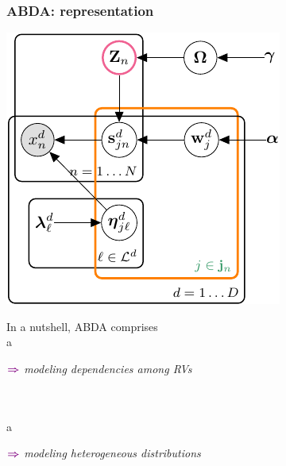 \documentclass[xcolor={usenames,dvipsnames,svgnames}, compress, aspectratio=169, 11pt]{beamer}
\newcommand{\comment}[3][\small]{\begin{minipage}{1\linewidth}
          \raggedleft
          {
            $\color{violet}\boldsymbol\Rightarrow$
            #1
            {\emph{#2}}
          }
      \end{minipage}#3\\
}
\begin{document}
\begin{frame}[t, htt=bgrey2]
  \frametitle{ABDA: representation}

  \large
  \begin{minipage}[t]{0.3\linewidth}
    \vspace{15pt}
    \includegraphics[width=.99\linewidth]{figures/joint-param-hspn-crop}
  \end{minipage}\hfill\begin{minipage}[t]{0.6\linewidth}
    \vspace{20pt}
    In a nutshell, ABDA comprises\\[10pt]
    a 
    \hspace{-70pt}\comment[\normalsize]{modeling dependencies among RVs}{}\\
    a 
    \hspace{-55pt}\comment[\normalsize]{modeling heterogeneous distributions}{}
  
  \end{minipage}  
\end{frame}
\end{document}
